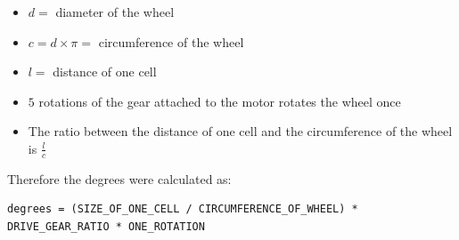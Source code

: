 \documentclass[11pt]{article}
\begin{document}
\begin{itemize}
\item $d =$ diameter of the wheel
\item $c = d \times \pi = $ circumference of the wheel
\item $l =$ distance of one cell
\item $5$ rotations of the gear attached to the motor rotates the wheel once
\item The ratio between the distance of one cell and the circumference of the wheel is $\frac{l}{c}$
\end{itemize}
Therefore the degrees were calculated as:
\begin{verbatim}
degrees = (SIZE_OF_ONE_CELL / CIRCUMFERENCE_OF_WHEEL) * DRIVE_GEAR_RATIO * ONE_ROTATION
\end{verbatim}


\newpage

\end{document}

